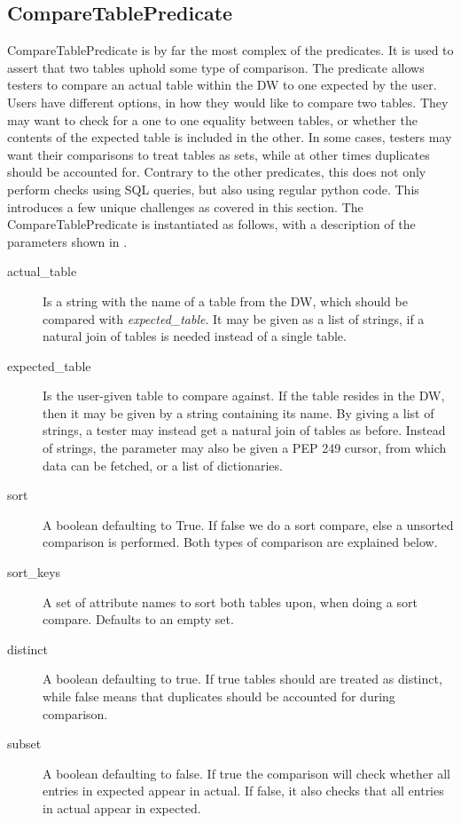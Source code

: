 \subsection{CompareTablePredicate}
CompareTablePredicate is by far the most complex of the predicates. It is used to assert that two tables uphold some type of comparison. The predicate allows testers to compare an actual table within the DW to one expected by the user. Users have different options, in how they would like to compare two tables. They may want to check for a one to one equality between tables, or whether the contents of the expected table is included in the other. In some cases, testers may want their comparisons to treat tables as sets, while at other times duplicates should be accounted for. Contrary to the other predicates, this does not only perform checks using SQL queries, but also using regular python code. This introduces a few unique challenges as covered in this section. The CompareTablePredicate is instantiated as follows, with a description of the parameters shown in .


\begin{description}
\item [actual\_table] Is a string with the name of a table from the DW, which should be compared with \textit{expected\_table}. It may be given as a list of strings, if a natural join of tables is needed instead of a single table.
\item [expected\_table] Is the user-given table to compare against. If the table resides in the DW, then it may be given by a string containing its name. By giving a list of strings, a tester may instead get a natural join of tables as before. Instead of strings, the parameter may also be given a PEP 249 cursor, from which data can be fetched, or a list of dictionaries.
\item [sort] A boolean defaulting to True. If false we do a sort compare, else a unsorted comparison is performed. Both types of comparison are explained below.
\item [sort\_keys] A set of attribute names to sort both tables upon, when doing a sort compare. Defaults to an empty set.
\item [distinct] A boolean defaulting to true. If true tables should are treated as distinct, while false means that duplicates should be accounted for during comparison.
\item [subset] A boolean defaulting to false. If true the comparison will check whether all entries in expected appear in actual. If false, it also checks that all entries in actual appear in expected.
\end{description}

